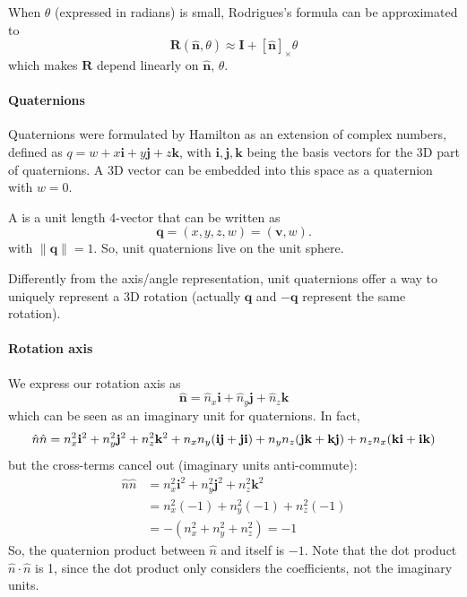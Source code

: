 When $\theta$ (expressed in radians) is small, Rodrigues's formula can be approximated to
$$\mathbf{R}(\hat{\mathbf{n}}, \theta)\approx \mathbf{I}+[\hat{\mathbf{n}}]_{\times}\theta$$
which makes $\mathbf{R}$ depend linearly on $\hat{\mathbf{n}}$, $\theta$. 

\paragraph{Quaternions}
Quaternions were formulated by Hamilton as an extension of complex numbers, defined as $q = w + x\mathbf{i} + y\mathbf{j} + z\mathbf{k}$, with $\mathbf{i},\mathbf{j},\mathbf{k}$ being the basis vectors for the 3D part of quaternions.
A 3D vector can be embedded into this space as a  quaternion with $w=0$.

A  is a unit length 4-vector that can be written as $$\mathbf{q}=(x,y,z,w)=(\mathbf{v},w).$$with $\| \mathbf{q} \|=1$. So, unit quaternions live on the unit sphere.

Differently from the axis/angle representation, unit quaternions offer a way to uniquely represent a 3D rotation (actually $\mathbf{q}$ and $-\mathbf{q}$ represent the same rotation).

\paragraph{Rotation axis}
We express our rotation axis as
$$\hat{\mathbf{n}}=\hat{n}_{x}\mathbf{i} + \hat{n}_{y}\mathbf{j} + \hat{n}_{z}\mathbf{k}$$
which can be seen as an imaginary unit for quaternions. In fact,
$$
\hat{n}\hat{n} = n_x^2\mathbf{i}^2 + n_y^2\mathbf{j}^2 + n_z^2\mathbf{k}^2 + n_x n_y(\mathbf{ij} + \mathbf{ji}) + n_y n_z(\mathbf{jk} + \mathbf{kj}) + n_z n_x(\mathbf{ki} + \mathbf{ik}) \\
$$
but the cross-terms cancel out (imaginary units anti-commute):
$$\begin{aligned}
\hat{n}\hat{n} &= n_x^2\mathbf{i}^2 + n_y^2\mathbf{j}^2 + n_z^2\mathbf{k}^2 \\
&=n_x^2(-1) + n_y^2(-1) + n_z^2(-1) \\
&=-(n_x^2 + n_y^2 + n_z^2) = -1 
\end{aligned}$$
So, the quaternion product between $\hat{n}$ and itself is $-1$. Note that the dot product $\hat{n}\cdot\hat{n}$ is 1, since the dot product only considers the coefficients, not the imaginary units.

